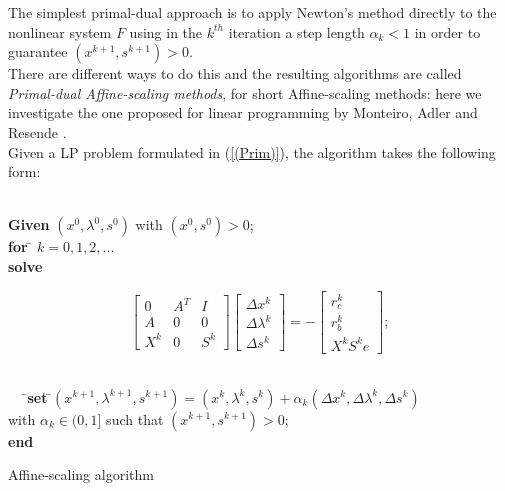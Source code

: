\documentclass[a4paper,10 pt,titlepage,twoside]{book}
\theoremstyle{plain}
\theoremstyle{definition}
\theoremstyle{remark}
\begin{document}
The simplest primal-dual approach is to apply Newton's method directly to the nonlinear system $F$ using in the $k^{th}$ iteration a step length $\alpha_{k}<1$ in order to guarantee $(x^{k+1},s^{k+1})>0$.\\ There are different ways to do this and the resulting algorithms are called \textit{Primal-dual Affine-scaling methods}, for short Affine-scaling methods: here we investigate the one proposed for linear programming by Monteiro,
Adler and Resende \cite{MARE}.\\ 
Given a LP problem formulated in (\ref{(Prim)}), the algorithm takes the following form:\\
\begin{algorithm}[H]\label{algaff}
\begin{tabbing}
	\\
	\textbf{Given} $(x^{0}, \lambda^{0}, s^{0})$ with $(x^{0}, s^{0})>0$;\\
	\textbf{for} \= $k = 0, 1, 2,...$ \\
	\> \textbf{solve}
	\end{tabbing}
\begin{equation}\label{mtx:aff}\tag{4.2b}	
\begin{bmatrix}
0&A^{T}&I \\A& 0&0\\X^{k}&0&S^{k}
\end{bmatrix}\begin{bmatrix}
\Delta x^{k}\\\Delta\lambda^{k} \\\Delta s^{k}
\end{bmatrix}=-\begin{bmatrix}
r_{c}^{k}\\r_{b}^{k}\\X^{k}S^{k}e
\end{bmatrix};
\end{equation}
\begin{tabbing}
	\\$\;\;\;\;\;$\=
	\>\textbf{set} \=$(x^{k+1}, \lambda^{k+1}, s^{k+1}) = (x^{k}, \lambda^{k}, s^{k})+ \alpha_{k}(\Delta x^{k}, \Delta\lambda^{k}, \Delta s^{k})$
	\\
	\>\> with $\alpha_{k}\in(0,1]$ such that $(x^{k+1}, s^{k+1})>0$; \\
	\textbf{end}
\end{tabbing}
\caption{\label{alg:AS}Affine-scaling algorithm}
\end{algorithm}
\end{document}
